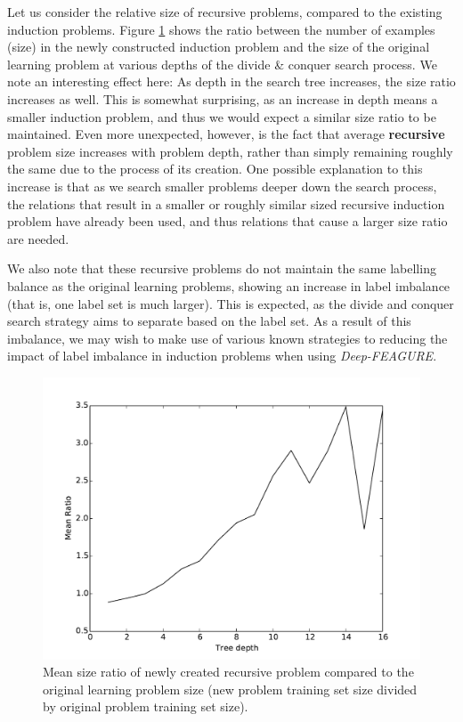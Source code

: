 \documentclass[twoside,11pt]{article}
\theoremstyle{definition}
\begin{document}
Let us consider the relative size of recursive problems, compared to the existing induction problems. Figure \ref{fig:problem_ratio} shows the ratio between the number of examples (size) in the  newly constructed induction problem and the size of the original learning problem at various depths of the divide \& conquer search process. We note an interesting effect here:
As depth in the search tree increases, the size ratio increases as well. This is somewhat surprising, as an increase in depth means a smaller induction problem, and thus we would expect a similar size ratio to be maintained. Even more unexpected, however, is the fact that average \textbf{recursive} problem size increases with problem depth, rather than simply remaining roughly the same due to the process of its creation. One possible explanation to this increase is that as we search smaller problems deeper down the search process, the relations that result in a smaller or roughly similar sized recursive induction problem have already been used, and thus relations that cause a larger size ratio are needed.

We also note that these recursive problems do not maintain the same labelling balance as the original learning problems, showing an increase in label imbalance (that is, one label set is much larger). This is expected, as the divide and conquer search strategy aims to separate based on the label set. As a result of this imbalance, we may wish to make use of various known strategies to reducing the impact of label imbalance in induction problems when using \emph{Deep-FEAGURE}.

\begin{figure}[h!]
	\centering
	\includegraphics[scale=0.4]{problem_ratio}
	\caption{Mean size ratio of newly created recursive problem compared to the original learning problem size (new problem training set size divided by original problem training set size).}
	\label{fig:problem_ratio}
\end{figure}
\end{document}
